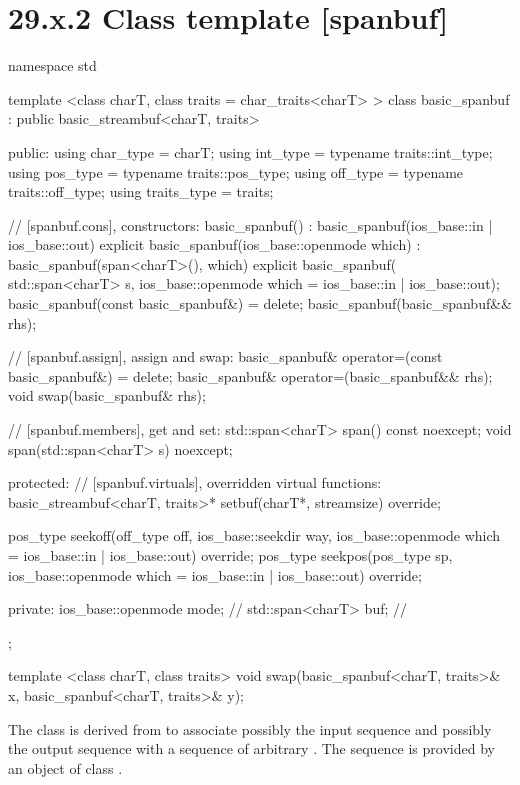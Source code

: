 \documentclass[ebook,11pt,article]{memoir}
\renewcommand{\iref}[1]{[#1]}
\begin{document}
\section{29.x.2 Class template  [spanbuf]}
\begin{codeblock}
namespace std {
  template <class charT, class traits = char_traits<charT> >
  class basic_spanbuf
    : public basic_streambuf<charT, traits> {
  public:
    using char_type      = charT;
    using int_type       = typename traits::int_type;
    using pos_type       = typename traits::pos_type;
    using off_type       = typename traits::off_type;
    using traits_type    = traits;

    // \iref{spanbuf.cons}, constructors:
    basic_spanbuf() : basic_spanbuf(ios_base::in | ios_base::out) {}
    explicit basic_spanbuf(ios_base::openmode which)
      : basic_spanbuf(span<charT>(), which) {}
    explicit basic_spanbuf(
      std::span<charT> s,
      ios_base::openmode which = ios_base::in | ios_base::out);
    basic_spanbuf(const basic_spanbuf&) = delete;
    basic_spanbuf(basic_spanbuf&& rhs);

    // \iref{spanbuf.assign}, assign and swap:
    basic_spanbuf& operator=(const basic_spanbuf&) = delete;
    basic_spanbuf& operator=(basic_spanbuf&& rhs);
    void swap(basic_spanbuf& rhs);

    // \iref{spanbuf.members}, get and set:
    std::span<charT> span() const noexcept;
    void span(std::span<charT> s) noexcept;

  protected:
    // \iref{spanbuf.virtuals}, overridden virtual functions:
    basic_streambuf<charT, traits>* setbuf(charT*, streamsize) override;

    pos_type seekoff(off_type off, ios_base::seekdir way,
                     ios_base::openmode which
                      = ios_base::in | ios_base::out) override;
    pos_type seekpos(pos_type sp,
                     ios_base::openmode which
                      = ios_base::in | ios_base::out) override;

  private:
    ios_base::openmode mode;  // \expos
    std::span<charT> buf; // \expos
  };

  template <class charT, class traits>
    void swap(basic_spanbuf<charT, traits>& x,
              basic_spanbuf<charT, traits>& y);
}
\end{codeblock}

\pnum
The class
is derived from
to associate possibly the input sequence and possibly
the output sequence with a sequence of arbitrary
.
The sequence is provided by an object of class
.
\end{document}
